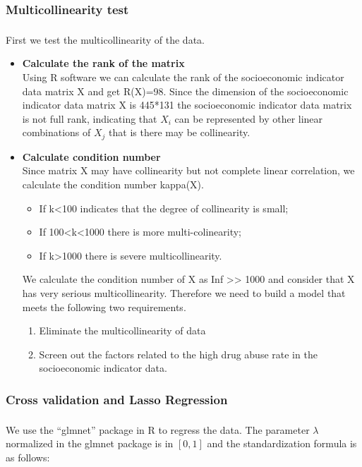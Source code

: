 \documentclass{mcmthesis}
\newcommand{\upcite}[1]{\textsuperscript{\textsuperscript{\cite{#1}}}}
\begin{document}
\subsubsection{ Multicollinearity test}
First we test the multicollinearity\upcite{mansfield1982detecting} of the data.
\begin{itemize}
  \item \textbf{Calculate the rank of the matrix}\\
Using R software we can calculate the rank of the socioeconomic indicator data matrix X and get R(X)=98.  Since the dimension of the socioeconomic indicator data matrix X is 445*131 the socioeconomic indicator data matrix is not full rank, indicating that $X_i$ can be represented by other linear combinations of $X_j$ that is there may be collinearity.
\item \textbf{Calculate condition number}\\
Since matrix X may have collinearity but not complete linear correlation, we calculate the condition number kappa(X). 

\begin{itemize}
  \item If k<100 indicates that the degree of collinearity is small;
  \item If 100<k<1000 there is more multi-colinearity;
  \item If k>1000 there is severe multicollinearity.
\end{itemize}

We calculate the condition number of X as Inf >> 1000 and consider that X has very serious multicollinearity.  Therefore we need to build a model that meets the following two requirements.
\begin{enumerate}
  \item Eliminate the multicollinearity of data
  \item Screen out the factors related to the high drug abuse rate in the socioeconomic indicator data.
\end{enumerate}
\end{itemize}



                                                
\subsubsection{Cross validation and Lasso Regression}

We use the “glmnet” package in R to regress the data\upcite{james2013introduction}. The parameter $\lambda$ normalized in the glmnet package is in $[0,1]$ and the standardization formula is as follows: 
\end{document}
